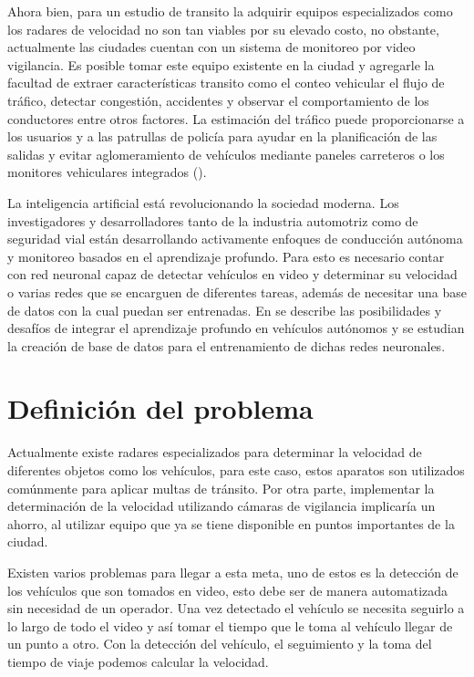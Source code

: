 Ahora bien, para un estudio de transito la adquirir equipos especializados como los radares de velocidad no son tan viables por su elevado costo, no obstante, actualmente las ciudades cuentan con un sistema de monitoreo por video vigilancia. Es posible tomar este equipo existente en la ciudad y agregarle la facultad de extraer características transito como el conteo vehicular el flujo de tráfico, detectar congestión, accidentes y observar el comportamiento de los conductores entre otros factores. La estimación del tráfico puede proporcionarse a los usuarios y a las patrullas de policía para ayudar en la planificación de las salidas y evitar aglomeramiento de vehículos mediante paneles carreteros o los monitores vehiculares integrados (\cite{impedovo2019Vehicular}).

La inteligencia artificial está revolucionando la sociedad moderna. Los investigadores y desarrolladores tanto de la industria automotriz como de seguridad vial están desarrollando activamente enfoques de conducción autónoma y monitoreo basados en el aprendizaje profundo. Para esto es necesario contar con red neuronal capaz de detectar vehículos en video y determinar su velocidad o varias redes que se encarguen de diferentes tareas, además de necesitar una base de datos con la cual puedan ser entrenadas. En \cite{rao2018Deep} se describe las posibilidades y desafíos de integrar el aprendizaje profundo en vehículos autónomos y se estudian la creación de base de datos para el entrenamiento de dichas redes neuronales.

\section{Definición del problema}

Actualmente existe radares especializados para determinar la velocidad de diferentes objetos como los vehículos, para este caso, estos aparatos son utilizados comúnmente para aplicar multas de tránsito. Por otra parte, implementar la determinación de la velocidad utilizando cámaras de vigilancia implicaría un ahorro, al utilizar equipo que ya se tiene disponible en puntos importantes de la ciudad.

Existen varios problemas para llegar a esta meta, uno de estos es la detección de los vehículos que son tomados en video, esto debe ser de manera automatizada sin necesidad de un operador. Una vez detectado el vehículo se necesita seguirlo a lo largo de todo el video y así tomar el tiempo que le toma al vehículo llegar de un punto a otro. Con la detección del vehículo, el seguimiento y la toma del tiempo de viaje podemos calcular la velocidad.

